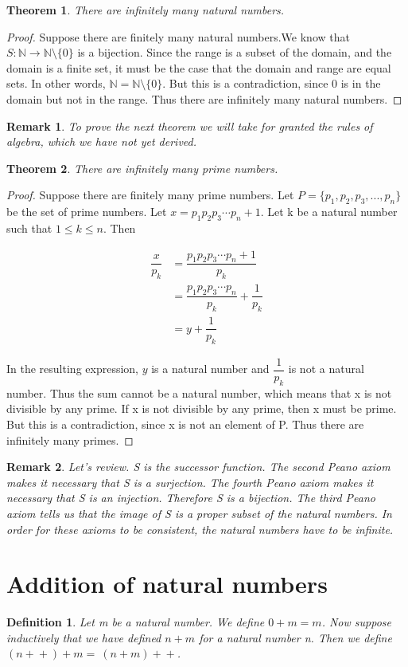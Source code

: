 \documentclass{article}
\newtheorem{definition}{Definition}
\newtheorem{theorem}{Theorem}
\newtheorem{remark}{Remark}
\newcommand{\inc}[1]{\mathrel{{{#1}+}+}}
\begin{document}
\begin{theorem}
There are infinitely many natural numbers. 
\end{theorem}

\begin{proof}
Suppose there are finitely many natural numbers.We know that $S : \mathbb{N} \to \mathbb{N}\setminus\{0\}$ is a bijection. Since the range is a subset of the domain, and the domain is a finite set, it must be the case that the domain and range are equal sets. In other words, $\mathbb{N} = \mathbb{N}\setminus\{0\}$. But this is a contradiction, since 0 is in the domain but not in the range. Thus there are infinitely many natural numbers. 
\end{proof}

\begin{remark}
To prove the next theorem we will take for granted the rules of algebra, which we have not yet derived.
\end{remark}

\begin{theorem}
There are infinitely many prime numbers.
\end{theorem}

\begin{proof}
Suppose there are finitely many prime numbers. Let $P = \{p_{1}, p_{2}, p_{3}, ... ,p_{n}\}$ be the set of prime numbers. Let $x = p_{1}p_{2}p_{3} \dotsm p_{n} + 1$. Let k be a natural number such that $1 \leq k \leq n$. Then 

\begin{align*}
\dfrac{x}{p_{k}} &= \dfrac{p_{1}p_{2}p_{3} \dotsm p_{n} + 1}{p_{k}} \\
&= \dfrac{p_{1}p_{2}p_{3} \dotsm p_{n}}{p_{k}} + \dfrac{1}{p_{k}} \\
&= y + \dfrac{1}{p_{k}}
\end{align*}

In the resulting expression, $y$ is a natural number and $\dfrac{1}{p_{k}}$ is not a natural number. Thus the sum cannot be a natural number, which means that x is not divisible by any prime. If x is not divisible by any prime, then x must be prime. But this is a contradiction, since x is not an element of P. Thus there are infinitely many primes. 
\end{proof}

\begin{remark}
Let's review. S is the successor function. The second Peano axiom makes it necessary that S is a surjection. The fourth Peano axiom makes it necessary that S is an injection. Therefore S is a bijection. The third Peano axiom tells us that the image of S is a proper subset of the natural numbers. In order for these axioms to be consistent, the natural numbers have to be infinite.
\end{remark}

\section{Addition of natural numbers}

\begin{definition}
Let m be a natural number. We define $0 + m = m$. Now suppose inductively that we have defined $n + m$ for a natural number n. Then we define $(\inc{n}) + m = \ \inc{(n+m)}$. 
\end{definition}
\end{document}

